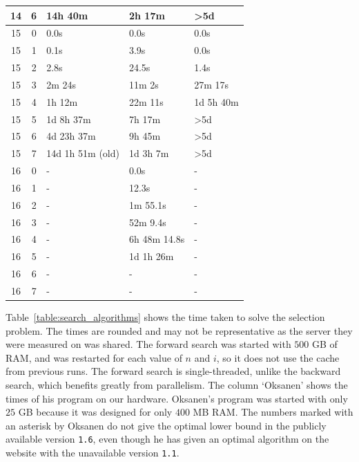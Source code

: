 \documentclass[twoside,leqno,twocolumn]{article}
\begin{document}
\begin{table}[!t]
\begin{tabular}{c|c|l|l|l}
    14  & 6   & 14h 40m          & 2h 17m            & >5d              \\
    \hline
    15  & 0   & 0.0s             & 0.0s              & 0.0s             \\
    15  & 1   & 0.1s             & 3.9s              & 0.0s             \\
    15  & 2   & 2.8s             & 24.5s             & 1.4s             \\
    15  & 3   & 2m 24s           & 11m 2s            & 27m 17s          \\
    15  & 4   & 1h 12m           & 22m 11s           & 1d 5h 40m        \\
    15  & 5   & 1d 8h 37m        & 7h 17m            & >5d              \\
    15  & 6   & 4d 23h 37m       & 9h 45m            & >5d              \\
    15  & 7   & 14d 1h 51m (old) & 1d 3h 7m          & >5d              \\ %
    \hline
    16  & 0   & -                & 0.0s              & -                \\
    16  & 1   & -                & 12.3s             & -                \\
    16  & 2   & -                & 1m 55.1s          & -                \\
    16  & 3   & -                & 52m 9.4s          & -                \\
    16  & 4   & -                & 6h 48m 14.8s      & -                \\
    16  & 5   & -                & 1d 1h 26m         & -                \\
    16  & 6   & -                & -                 & -                \\
    16  & 7   & -                & -                 & -                \\
  \end{tabular}
\end{table}

Table~\ref{table:search_algorithms} shows the time taken to solve the selection problem.
The times are rounded and may not be representative as the server they were measured on was shared.
The forward search was started with $500$ GB of RAM, and was restarted for each value of $n$ and $i$, so it does not use the cache from previous runs.
The forward search is single-threaded, unlike the backward search, which benefits greatly from parallelism.
The column `Oksanen' shows the times of his program \cite{Oksanen} on our hardware.
Oksanen's program was started with only $25$ GB because it was designed for only $400$ MB RAM.
The numbers marked with an asterisk by Oksanen do not give the optimal lower bound in the publicly available version \texttt{1.6}, even though he has given an optimal algorithm on the website with the unavailable version \texttt{1.1}.
\end{document}
